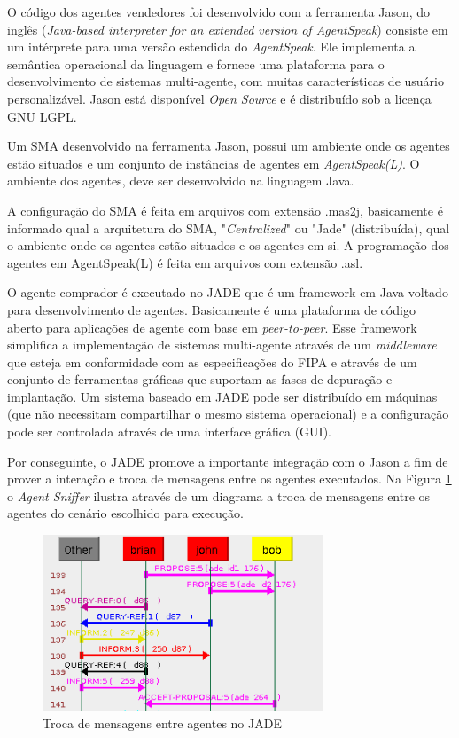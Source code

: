 \documentclass[conference]{IEEEtran}
\begin{document}
    O código dos agentes vendedores foi desenvolvido com a ferramenta Jason, do inglês (\textit{Java-based interpreter for an extended version of AgentSpeak}) consiste em um intérprete para uma versão estendida do \textit{AgentSpeak}. Ele implementa a semântica operacional da linguagem e fornece uma plataforma para o desenvolvimento de sistemas multi-agente, com muitas características de usuário personalizável. Jason está disponível \textit{Open Source} e é distribuído sob a licença GNU LGPL.
      
        Um SMA desenvolvido na ferramenta Jason, possui um ambiente onde os agentes estão situados e um conjunto de instâncias de agentes em \textit{AgentSpeak(L)}. O ambiente dos agentes, deve ser desenvolvido na linguagem Java.        
   
        A configuração do SMA é feita em arquivos com extensão .mas2j, basicamente é informado qual a arquitetura do SMA, "\textit{Centralized}" ou "Jade" (distribuída), qual o ambiente onde os agentes estão situados e os agentes em si. A programação dos agentes em AgentSpeak(L) é feita em arquivos com extensão .asl.
        
        O agente comprador é executado no JADE que é um framework em Java voltado para desenvolvimento de agentes. Basicamente é uma plataforma de código aberto para aplicações de agente com base em \textit{peer-to-peer}. Esse framework simplifica a implementação de sistemas multi-agente através de um \textit{middleware} que esteja em conformidade com as especificações do FIPA e através de um conjunto de ferramentas gráficas que suportam as fases de depuração e implantação. Um sistema baseado em JADE pode ser distribuído em máquinas (que não necessitam compartilhar o mesmo sistema operacional) e a configuração pode ser controlada através de uma interface gráfica (GUI).
        
        Por conseguinte, o JADE promove a importante integração com o Jason a fim de prover a interação e troca de mensagens entre os agentes executados. Na Figura \ref{fig:snifer} o \textit{Agent Sniffer} ilustra  através de um diagrama a troca de mensagens entre os agentes do cenário escolhido para execução.
        
		 \begin{figure}[ht]
            \begin{center}
                \includegraphics[width=3.3in]{sniffer}
            \end{center}
            \caption{Troca de mensagens entre agentes no JADE}
            \label{fig:snifer}
        \end{figure}
    
\end{document}
